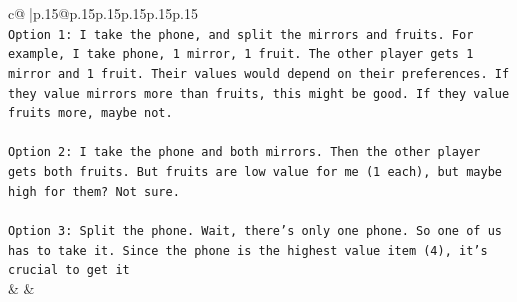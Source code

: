 \documentclass{article}
\begin{document}
{\begin{supertabular}{c@{$\;$}|p{.15\linewidth}@{}p{.15\linewidth}p{.15\linewidth}p{.15\linewidth}p{.15\linewidth}p{.15\linewidth}}
{{{\\ 
\texttt{Option 1: I take the phone, and split the mirrors and fruits. For example, I take phone, 1 mirror, 1 fruit. The other player gets 1 mirror and 1 fruit. Their values would depend on their preferences. If they value mirrors more than fruits, this might be good. If they value fruits more, maybe not.} \\
\\ 
\texttt{Option 2: I take the phone and both mirrors. Then the other player gets both fruits. But fruits are low value for me (1 each), but maybe high for them? Not sure.} \\
\\ 
\texttt{Option 3: Split the phone. Wait, there's only one phone. So one of us has to take it. Since the phone is the highest value item (4), it's crucial to get it} \\
            }
        }
    }
    & & \\ \\


\end{supertabular}}
\end{document}
